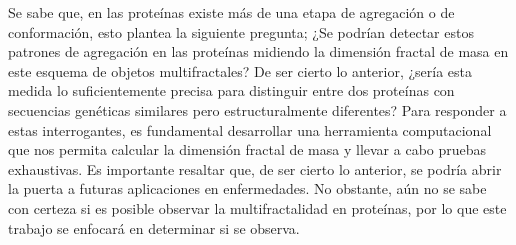 Se sabe que, en las prote\'{i}nas existe m\'{a}s de una etapa de agregaci\'{o}n o de conformaci\'{o}n, esto plantea la siguiente pregunta; ¿Se podr\'{i}an detectar estos patrones de agregaci\'{o}n en las prote\'{i}nas midiendo la dimensi\'{o}n fractal de masa en este esquema de objetos multifractales? De ser cierto lo anterior, ¿ser\'{i}a esta medida lo suficientemente precisa para distinguir entre dos prote\'{i}nas con secuencias gen\'{e}ticas similares pero estructuralmente diferentes? Para responder a estas interrogantes, es fundamental desarrollar una herramienta computacional que nos permita calcular la dimensi\'{o}n fractal de masa y llevar a cabo pruebas exhaustivas. Es importante resaltar que, de ser cierto lo anterior, se podr\'{i}a abrir la puerta a futuras aplicaciones en enfermedades. No obstante, a\'{u}n no se sabe con certeza si es posible observar la multifractalidad en prote\'{i}nas, por lo que este trabajo se enfocar\'{a} en determinar si se observa.



















